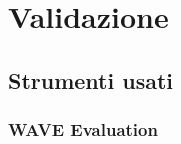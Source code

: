 \documentclass[a4paper]{article}
\begin{document}
		

	\section{Validazione}
		\subsection{Strumenti usati}
			
			\subsubsection{WAVE Evaluation}
				
				
\end{document}
